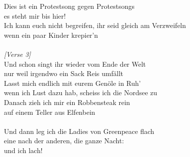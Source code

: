 {Dies ist ein Protestsong gegen Protestsongs\\
es steht mir bis hier!\\
Ich kann euch nicht begreifen, ihr seid gleich am Verzweifeln\\
wenn ein paar Kinder krepier'n\\
\\
\emph{[Verse 3]}\\
Und schon singt ihr wieder vom Ende der Welt\\
nur weil irgendwo ein Sack Reis umf{\"a}llt\\
Lasst mich endlich mit eurem Gen{\"o}le in Ruh'\\
wenn ich Lust dazu hab, scheiss ich die Nordsee zu\\
Danach zieh ich mir ein Robbensteak rein\\
auf einem Teller aus Elfenbein\\
\\
Und dann leg ich die Ladies von Greenpeace flach\\
eine nach der anderen, die ganze Nacht:\\
und ich lach!
}


